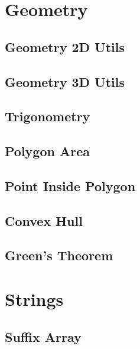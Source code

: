 \documentclass[10pt,landscape,twocolumn,a4paper,notitlepage]{article}
\begin{document}
\section{Geometry}

  \subsection{Geometry 2D Utils}
  

  \subsection{Geometry 3D Utils}
  

  \subsection{Trigonometry}
  
  
  \subsection{Polygon Area}
  

  \subsection{Point Inside Polygon}
  

  \subsection{Convex Hull}
  

  \subsection{Green's Theorem}
  

\section{Strings}
  \subsection{Suffix Array}
  
\end{document}
